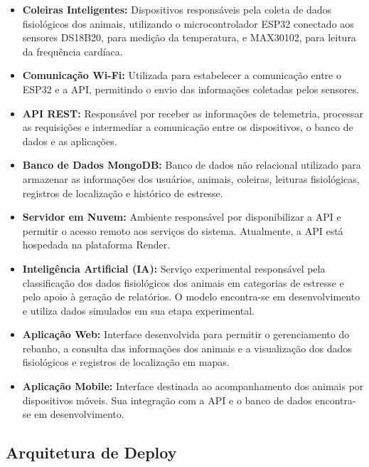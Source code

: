 \documentclass[11pt,a4paper]{article}
\begin{document}
\begin{itemize}
    \item \textbf{Coleiras Inteligentes:} Dispositivos responsáveis pela coleta de dados fisiológicos dos animais, utilizando o microcontrolador ESP32 conectado aos sensores DS18B20, para medição da temperatura, e MAX30102, para leitura da frequência cardíaca.

    \item \textbf{Comunicação Wi-Fi:} Utilizada para estabelecer a comunicação entre o ESP32 e a API, permitindo o envio das informações coletadas pelos sensores.

    \item \textbf{API REST:} Responsável por receber as informações de telemetria, processar as requisições e intermediar a comunicação entre os dispositivos, o banco de dados e as aplicações.

    \item \textbf{Banco de Dados MongoDB:} Banco de dados não relacional utilizado para armazenar as informações dos usuários, animais, coleiras, leituras fisiológicas, registros de localização e histórico de estresse.

    \item \textbf{Servidor em Nuvem:} Ambiente responsável por disponibilizar a API e permitir o acesso remoto aos serviços do sistema. Atualmente, a API está hospedada na plataforma Render.

    \item \textbf{Inteligência Artificial (IA):} Serviço experimental responsável pela classificação dos dados fisiológicos dos animais em categorias de estresse e pelo apoio à geração de relatórios. O modelo encontra-se em desenvolvimento e utiliza dados simulados em sua etapa experimental.

    \item \textbf{Aplicação Web:} Interface desenvolvida para permitir o gerenciamento do rebanho, a consulta das informações dos animais e a visualização dos dados fisiológicos e registros de localização em mapas.

    \item \textbf{Aplicação Mobile:} Interface destinada ao acompanhamento dos animais por dispositivos móveis. Sua integração com a API e o banco de dados encontra-se em desenvolvimento.
\end{itemize}

\subsection{Arquitetura de Deploy}
\end{document}
